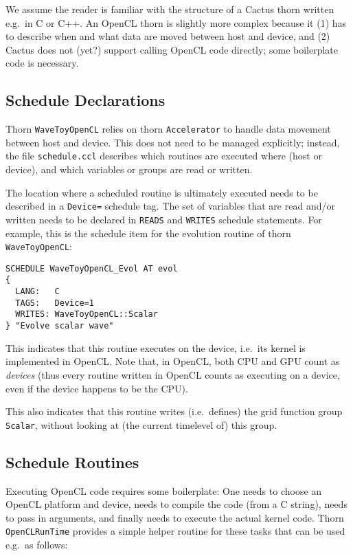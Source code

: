 We assume the reader is familiar with the structure of a Cactus thorn
written e.g.\ in C or C++. An OpenCL thorn is slightly more complex
because it (1) has to describe when and what data are moved between
host and device, and (2) Cactus does not (yet?) support calling OpenCL
code directly; some boilerplate code is necessary.

\subsection{Schedule Declarations}

Thorn \texttt{WaveToyOpenCL} relies on thorn \texttt{Accelerator} to
handle data movement between host and device. This does not need to be
managed explicitly; instead, the file \texttt{schedule.ccl} describes
which routines are executed where (host or device), and which
variables or groups are read or written.

The location where a scheduled routine is ultimately executed needs to
be described in a \texttt{Device=} schedule tag. The set of variables
that are read and/or written needs to be declared in \texttt{READS}
and \texttt{WRITES} schedule statements. For example, this is the
schedule item for the evolution routine of thorn
\texttt{WaveToyOpenCL}:

\begin{verbatim}
SCHEDULE WaveToyOpenCL_Evol AT evol
{
  LANG:   C
  TAGS:   Device=1
  WRITES: WaveToyOpenCL::Scalar
} "Evolve scalar wave"
\end{verbatim}

This indicates that this routine executes on the device, i.e.\ its
kernel is implemented in OpenCL\@. Note that, in OpenCL, both CPU and
GPU count as \emph{devices} (thus every routine written in OpenCL
counts as executing on a device, even if the device happens to be the
CPU\@).

This also indicates that this routine writes (i.e.\ defines) the grid
function group \texttt{Scalar}, without looking at (the current
timelevel of) this group.

\subsection{Schedule Routines}

Executing OpenCL code requires some boilerplate: One needs to choose
an OpenCL platform and device, needs to compile the code (from a
C string), needs to pass in arguments, and finally needs to execute
the actual kernel code. Thorn \texttt{OpenCLRunTime} provides a simple
helper routine for these tasks that can be used e.g.\ as follows:

